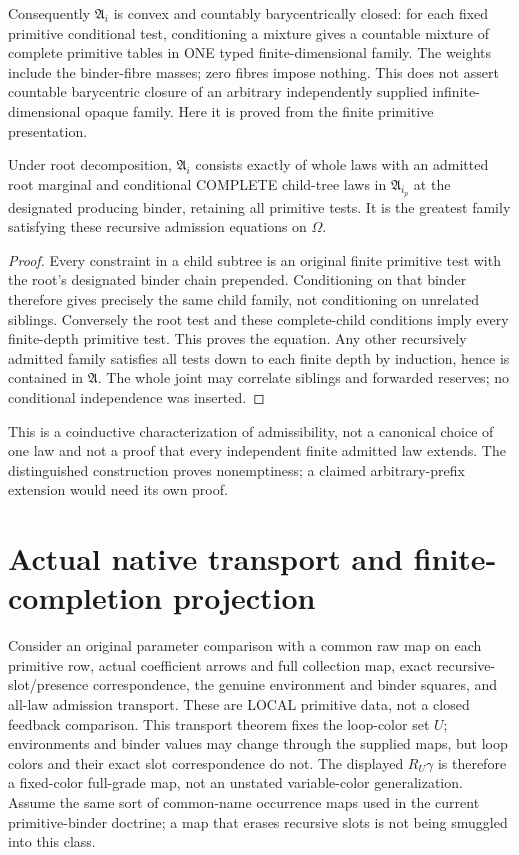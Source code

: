 \documentclass[11pt]{article}
\begin{document}
Consequently $\mathfrak A_i$ is convex and countably barycentrically closed: for each fixed primitive conditional test, conditioning a mixture gives a countable mixture of complete primitive tables in ONE typed finite-dimensional family. The weights include the binder-fibre masses; zero fibres impose nothing. This does not assert countable barycentric closure of an arbitrary independently supplied infinite-dimensional opaque family. Here it is proved from the finite primitive presentation.

\begin{proposition}
Under root decomposition, $\mathfrak A_i$ consists exactly of whole laws with an admitted root marginal and conditional COMPLETE child-tree laws in $\mathfrak A_{i_p}$ at the designated producing binder, retaining all primitive tests. It is the greatest family satisfying these recursive admission equations on $\Omega$.
\end{proposition}
\begin{proof}
Every constraint in a child subtree is an original finite primitive test with the root's designated binder chain prepended. Conditioning on that binder therefore gives precisely the same child family, not conditioning on unrelated siblings. Conversely the root test and these complete-child conditions imply every finite-depth primitive test. This proves the equation. Any other recursively admitted family satisfies all tests down to each finite depth by induction, hence is contained in $\mathfrak A$. The whole joint may correlate siblings and forwarded reserves; no conditional independence was inserted.\end{proof}

This is a coinductive characterization of admissibility, not a canonical choice of one law and not a proof that every independent finite admitted law extends. The distinguished construction proves nonemptiness; a claimed arbitrary-prefix extension would need its own proof.

\section{Actual native transport and finite-completion projection}
Consider an original parameter comparison with a common raw map on each primitive row, actual coefficient arrows and full collection map, exact recursive-slot/presence correspondence, the genuine environment and binder squares, and all-law admission transport. These are LOCAL primitive data, not a closed feedback comparison. This transport theorem fixes the loop-color set $U$; environments and binder values may change through the supplied maps, but loop colors and their exact slot correspondence do not. The displayed $R_U\gamma$ is therefore a fixed-color full-grade map, not an unstated variable-color generalization. Assume the same sort of common-name occurrence maps used in the current primitive-binder doctrine; a map that erases recursive slots is not being smuggled into this class.
\end{document}
